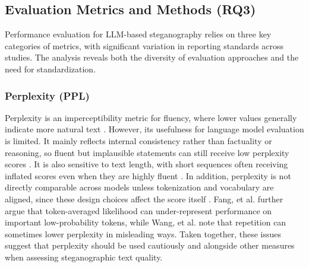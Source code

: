 \subsection{Evaluation Metrics and Methods (RQ3)}
\label{subsec:rq3}

Performance evaluation for LLM-based steganography relies on three key categories of metrics, with significant variation in reporting standards across studies. The analysis reveals both the diversity of evaluation approaches and the need for standardization.



\subsubsection{Perplexity (PPL)}

Perplexity is an imperceptibility metric for fluency, where lower values generally indicate more natural text \cite{jelinek1977perplexity}. However, its usefulness for language model evaluation is limited. It mainly reflects internal consistency rather than factuality or reasoning, so fluent but implausible statements can still receive low perplexity scores \cite{wang2022perplexity}. It is also sensitive to text length, with short sequences often receiving inflated scores even when they are highly fluent \cite{fang2025wrong}. In addition, perplexity is not directly comparable across models unless tokenization and vocabulary are aligned, since these design choices affect the score itself \cite{morgan2024perplexity}. Fang, et al. \cite{fang2025wrong} further argue that token-averaged likelihood can under-represent performance on important low-probability tokens, while Wang, et al. \cite{wang2022perplexity} note that repetition can sometimes lower perplexity in misleading ways. Taken together, these issues suggest that perplexity should be used cautiously and alongside other measures when assessing steganographic text quality.


